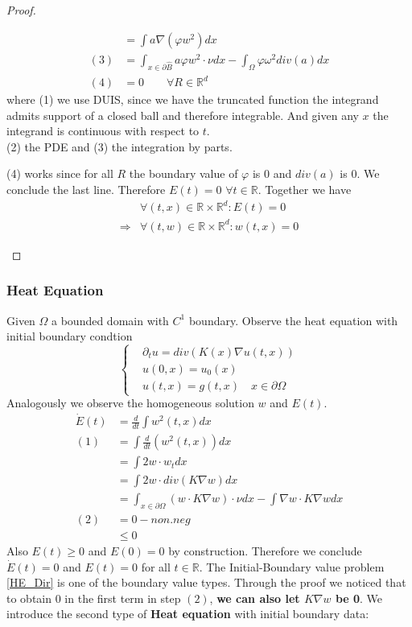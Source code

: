 \documentclass[a4paper,11pt,oneside,fleqn]{book}
\theoremstyle{definition}
\theoremstyle{remark}
\begin{document}
\begin{proof}
\begin{enumerate}
\begin{align*}
			&= \int a \nabla(\varphi w^2)dx\\
		 (3)&= \int_{x \in \partial \hat{B}} a \varphi w^2 \cdot \nu dx -  \int_\Omega \varphi \omega^2 div(a) dx\\
		 (4)&= 0 \qquad \forall R \in \mathbb{R}^d
		\end{align*}
		where (1) we use DUIS, since we have the truncated function the integrand admits support of a closed ball and therefore integrable. And given any $x$ the integrand is continuous with respect to $t$. 
		\\ (2) the PDE and (3) the integration by parts.\par 
		(4) works since for all $R$ the boundary value of $\varphi$ is 0  and $div(a)$ is 0. We conclude the last line.
		Therefore $E(t) = 0$ $\forall t \in \mathbb{R}$. Together we have
		\begin{align*}
			&\forall (t, x) \in \mathbb{R} \times \mathbb{R}^d: E(t) = 0\\ \Rightarrow &\forall (t, w) \in \mathbb{R} \times \mathbb{R}^d: w(t, x) = 0
		\end{align*}
	\end{enumerate}
\end{proof}

\subsubsection*{Heat Equation}
Given $\Omega$ a bounded domain with $C^1$ boundary. Observe the heat equation with initial boundary condtion
\begin{equation}\label{HE_Dir}
	\left\{
	\begin{aligned}
		&\partial_t u = div(K(x) \nabla u(t, x))\\
		&u(0, x) = u_0(x)\\
		&u(t, x) = g(t, x) \quad x \in \partial \Omega
	\end{aligned}
	\right.
\end{equation}
Analogously we observe the homogeneous solution $w$ and $E(t)$. 
\begin{align*}
	\dot{E}(t) &= \frac{d}{dt} \int w^2(t, x)dx\\
	(1)&= \int \frac{d}{dt}(w^2(t, x)) dx\\
	   &= \int 2w \cdot w_t dx \\
 	   &= \int 2w \cdot div(K \nabla w) dx\\
	   &= \int_{x \in \partial \Omega} (w \cdot K \nabla w) \cdot \nu dx - \int \nabla w \cdot K \nabla wdx \\
	(2)&= 0  -  non.neg\\
	   &\leq 0
\end{align*}
Also $E(t) \geq 0$ and $E(0) = 0$ by construction. Therefore we conclude $\dot{E}(t) = 0$ and $E(t) = 0$ for all $t \in \mathbb{R}$.
The Initial-Boundary value problem \ref{HE_Dir} is one of the boundary value types. Through the proof we noticed that to obtain $0$ in the first term in step $(2)$, \textbf{we can also let $K \nabla w$ be 0}. We introduce the second type of \textbf{Heat equation} with initial boundary data:
\end{document}
